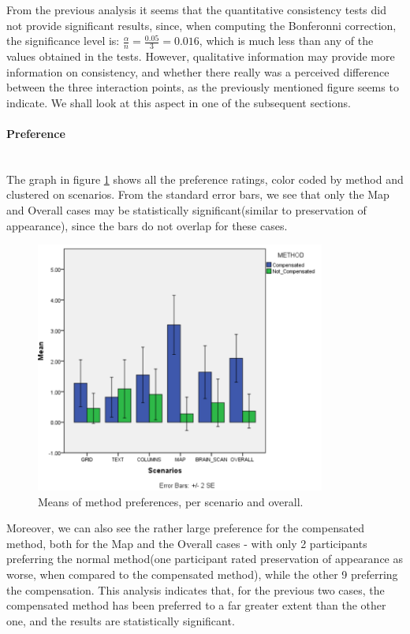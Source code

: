 \documentclass[]{article}
\begin{document}
From the previous analysis it seems that the quantitative consistency tests did not provide significant results, since, when computing the Bonferonni correction, the significance level is: $\frac{\alpha}{n} = \frac{0.05}{3} = 0.016$, which is much less than any of the values obtained in the tests. However, qualitative information may provide more information on consistency, and whether there really was a perceived difference between the three interaction points, as the previously mentioned figure seems to indicate. We shall look at this aspect in one of the subsequent sections.
\\
\paragraph{Preference}\mbox{}\\

The graph in figure \ref{fig:Preference_Graph} shows all the preference ratings, color coded by method and clustered on scenarios. From the standard error bars, we see that only the Map and Overall cases may be statistically significant(similar to preservation of appearance), since the bars do not overlap for these cases.

\begin{figure}[!h]
    \centering
    \includegraphics[width=0.85\textwidth]{figures/results/Preference_Graph.PNG}
    \caption{Means of method preferences, per scenario and overall.}
    \label{fig:Preference_Graph}
\end{figure}

Moreover, we can also see the rather large preference for the compensated method, both for the Map and the Overall cases - with only 2 participants preferring the normal method(one participant rated  preservation of appearance as worse, when compared to the compensated method), while the other 9 preferring the compensation. This analysis indicates that, for the previous two cases, the compensated method has been preferred to a far greater extent than the other one, and the results are statistically significant.  
\end{document}
